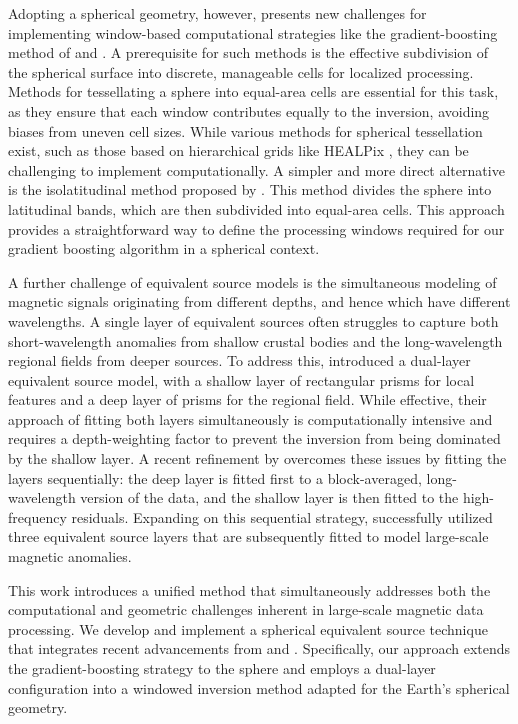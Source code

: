 Adopting a spherical geometry, however, presents new challenges for
implementing window-based computational strategies like the gradient-boosting
method of \citet{Soler2021} and \citet{Uppal2025}.
A prerequisite for such methods is the effective subdivision of the spherical
surface into discrete, manageable cells for localized processing.
Methods for tessellating a sphere into equal-area cells are essential for this
task, as they ensure that each window contributes equally to the inversion,
avoiding biases from uneven cell sizes.
While various methods for spherical tessellation exist, such as those based on
hierarchical grids like HEALPix \citep{Gorski1998}, they can be challenging to
implement computationally.
A simpler and more direct alternative is the isolatitudinal method proposed by
\citet{Malkin2016}.
This method divides the sphere into latitudinal bands, which are then
subdivided into equal-area cells.
This approach provides a straightforward way to define the processing windows
required for our gradient boosting algorithm in a spherical context.

A further challenge of equivalent source models is the simultaneous modeling of
magnetic signals originating from different depths, and hence which have
different wavelengths.
A single layer of equivalent sources often struggles to capture both
short-wavelength anomalies from shallow crustal bodies and the long-wavelength
regional fields from deeper sources.
To address this, \citet{Li2020} introduced a dual-layer equivalent source
model, with a shallow layer of rectangular prisms for local features and a deep
layer of prisms for the regional field.
While effective, their approach of fitting both layers simultaneously is
computationally intensive and requires a depth-weighting factor to prevent the
inversion from being dominated by the shallow layer.
A recent refinement by \citet{Uppal2025} overcomes these issues by fitting the
layers sequentially: the deep layer is fitted first to a block-averaged,
long-wavelength version of the data, and the shallow layer is then fitted to
the high-frequency residuals. Expanding on this sequential strategy,
\citet{Heincke2026} successfully utilized three equivalent source layers that
are subsequently fitted to model large-scale magnetic anomalies.

This work introduces a unified method that simultaneously addresses both the
computational and geometric challenges inherent in large-scale magnetic data
processing.
We develop and implement a spherical equivalent source technique that
integrates recent advancements from \citet{Soler2021} and \citet{Uppal2025}.
Specifically, our approach extends the gradient-boosting strategy to the sphere
\citep{Soler2021} and employs a dual-layer configuration \citep{Uppal2025} into
a windowed inversion method adapted for the Earth's spherical geometry.

